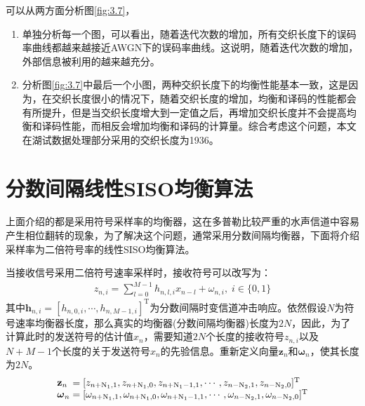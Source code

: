 可以从两方面分析图\ref{fig:3.7}，
\begin{enumerate}
    \item
        单独分析每一个图，可以看出，随着迭代次数的增加，所有交织长度下的误码率曲线都越来越接近AWGN下的误码率曲线。这说明，随着迭代次数的增加，外部信息被利用的越来越充分。
    \item
        分析图\ref{fig:3.7}中最后一个小图，两种交织长度下的均衡性能基本一致，这是因为，在交织长度很小的情况下，随着交织长度的增加，均衡和译码的性能都会有所提升，但是当交织长度增大到一定值之后，再增加交织长度并不会提高均衡和译码性能，而相反会增加均衡和译码的计算量。综合考虑这个问题，本文在湖试数据处理部分采用的交织长度为1936。
\end{enumerate}

\section{分数间隔线性SISO均衡算法}
上面介绍的都是采用符号采样率的均衡器，这在多普勒比较严重的水声信道中容易产生相位翻转的现象，为了解决这个问题，通常采用分数间隔均衡器，下面将介绍采样率为二倍符号率的线性SISO均衡算法。

当接收信号采用二倍符号速率采样时，接收符号可以改写为：
\begin{eqnarray}
    z_{n,i}=\sum_{l=0}^{M-1}h_{n,l,i}x_{n-l}+\omega_{n,i},\;i\in\{0,1\}
    \label{equ:3.38}
\end{eqnarray}
其中$\mathbf{h}_{n,i}=[h_{n,0,i},\cdots,h_{n,M-1,i}]^{\mathrm{T}}$为分数间隔时变信道冲击响应。依然假设$N$为符号速率均衡器长度，那么真实的均衡器(分数间隔均衡器)长度为$2N$，因此，为了计算此时的发送符号的估计值$\hat{x}_n$，需要知道$2N$个长度的接收符号$z_{n,i}$以及$N+M-1$个长度的关于发送符号$x_n$的先验信息。重新定义向量$\mathbf{z}_n$和$\boldsymbol{\omega}_n$，使其长度为$2N$。
\begin{eqnarray}
    \begin{array}{l@{\;=\;}l}
        \mathbf{z}_n&[z_{n+\mathrm{N}_1,1},z_{n+\mathrm{N}_1,0},z_{n+\mathrm{N}_1-1,1},\cdots,z_{n-\mathrm{N}_2,1},z_{n-\mathrm{N}_2,0}]^{\mathrm{T}}\\
        \boldsymbol{\omega}_n&[\omega_{n+\mathrm{N}_1,1},\omega_{n+\mathrm{N}_1,0},\omega_{n+\mathrm{N}_1-1,1},\cdots,\omega_{n-\mathrm{N}_2,1},\omega_{n-\mathrm{N}_2,0}]^{\mathrm{T}}
    \end{array}
    \label{equ:3.39}
\end{eqnarray}

